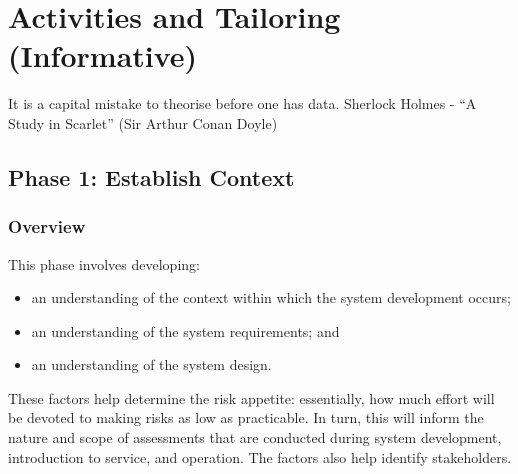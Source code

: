%
%
\section{Activities and Tailoring (Informative)}\label{bkm:activitiestailoring}

\dsiwgSectionQuote
  {It is a capital mistake to theorise before one has data.}
  {Sherlock Holmes - ``A Study in Scarlet'' (Sir Arthur Conan Doyle)}


\subsection{Phase 1: Establish Context}
\subsubsection{Overview}
This phase involves developing:
\begin{itemize}
	\item an understanding of the context within which the system development occurs; 
	\item an understanding of the system requirements; and 
	\item an understanding of the system design.
\end{itemize}

These factors help determine the risk appetite: essentially, how much effort will be devoted to making risks as low as practicable. In turn, this will inform the nature and scope of assessments that are conducted during system development, introduction to service, and operation. The factors also help identify \glspl{stakeholder}.

